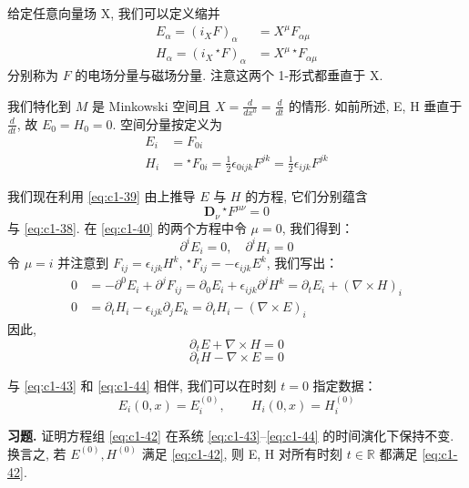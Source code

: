 \begin{definition*}
给定任意向量场 X, 我们可以定义缩并
\[
\begin{aligned}
E_\alpha = (i_XF)_\alpha &= X^\mu F_{\alpha\mu}\\
H_\alpha = (i_X\, {}^\star F)_\alpha &= X^\mu\, {}^\star F_{\alpha\mu}
\end{aligned}
\]
分别称为 $F$ 的电场分量与磁场分量. 注意这两个 1-形式都垂直于 X. 
\end{definition*}

我们特化到 $M$ 是 Minkowski 空间且 $X = \frac{d}{dx^0} = \frac{d}{dt}$ 的情形. 如前所述, E, H 垂直于 $\frac{d}{dt}$, 故 $E_0 = H_0 = 0$. 空间分量按定义为
\[
\begin{aligned}
E_i &= F_{0i}\\
H_i &= {}^\star F_{0i} = \frac{1}{2}\epsilon_{0ijk}F^{jk} = \frac{1}{2}\epsilon_{ijk}F^{jk}
\end{aligned}
\]

我们现在利用 \eqref{eq:c1-39} 由上推导 $E$ 与 $H$ 的方程, 它们分别蕴含
\begin{equation}
\mathbf{D}_\nu\, {}^\star F^{\mu\nu} = 0\label{eq:c1-41}
\end{equation}
与 \eqref{eq:c1-38}. 在 \eqref{eq:c1-40} 的两个方程中令 $\mu = 0$, 我们得到：
\begin{equation}
\partial^iE_i = 0, \quad \partial^iH_i = 0\label{eq:c1-42}
\end{equation}
令 $\mu = i$ 并注意到 $F_{ij} = \epsilon_{ijk}H^k$, ${}^\star F_{ij} = -\epsilon_{ijk}E^k$, 我们写出：
\[
\begin{aligned}
0 &= -\partial^0E_i + \partial^jF_{ij} = \partial_0E_i + \epsilon_{ijk}\partial^jH^k = \partial_tE_i + (\nabla\times H)_i\\
0 &= \partial_tH_i - \epsilon_{ijk}\partial_jE_k = \partial_tH_i - (\nabla\times E)_i
\end{aligned}
\]
因此, 
\begin{equation}
\partial_tE + \nabla\times H = 0\label{eq:c1-43}
\end{equation}
\begin{equation}
\partial_tH - \nabla\times E = 0\label{eq:c1-44}
\end{equation}

与 \eqref{eq:c1-43} 和 \eqref{eq:c1-44} 相伴, 我们可以在时刻 $t = 0$ 指定数据：
\[
E_i(0, x) = E_i^{(0)}, \qquad H_i(0, x) = H_i^{(0)}
\]

\textbf{习题.} 证明方程组 \eqref{eq:c1-42} 在系统 \eqref{eq:c1-43}–\eqref{eq:c1-44} 的时间演化下保持不变. 换言之, 若 $E^{(0)}, H^{(0)}$ 满足 \eqref{eq:c1-42}, 则 E, H 对所有时刻 $t \in \mathbb{R}$ 都满足 \eqref{eq:c1-42}. 

